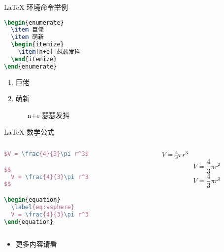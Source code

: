 \documentclass[aspectratio=169]{beamer}
\begin{document}
\begin{frame}[fragile]{\LaTeX{} 环境命令举例}
    \begin{minipage}{0.5\linewidth}
\begin{lstlisting}[language=TeX]
\begin{enumerate}
  \item 巨佬
  \item 萌新
  \begin{itemize}
    \item[n+e] 瑟瑟发抖
  \end{itemize}
\end{enumerate}
\end{lstlisting}
    \end{minipage}\hspace{1cm}
    \begin{minipage}{0.3\linewidth}
        \begin{enumerate}
            \item 巨佬
            \item 萌新
            \begin{itemize}
                \item[n+e] 瑟瑟发抖
            \end{itemize}
        \end{enumerate}
    \end{minipage}
\end{frame}

\begin{frame}[fragile]{\LaTeX{} 数学公式}
    \begin{columns}
        \begin{column}{.55\textwidth}
\begin{lstlisting}[language=TeX]
$V = \frac{4}{3}\pi r^3$

$$
  V = \frac{4}{3}\pi r^3
$$

\begin{equation}
  \label{eq:vsphere}
  V = \frac{4}{3}\pi r^3
\end{equation}
\end{lstlisting}
        \end{column}
        \begin{column}{.4\textwidth}
            $V = \frac{4}{3}\pi r^3$
            $$
                V = \frac{4}{3}\pi r^3
            $$
            \begin{equation}
                \label{eq:vsphere}
                V = \frac{4}{3}\pi r^3
            \end{equation}
        \end{column}
    \end{columns}
    \begin{itemize}
        \item 更多内容请看 \href{https://zh.wikipedia.org/wiki/Help:数学公式}{\color{purple}{这里}}
    \end{itemize}
\end{frame}
\end{document}
